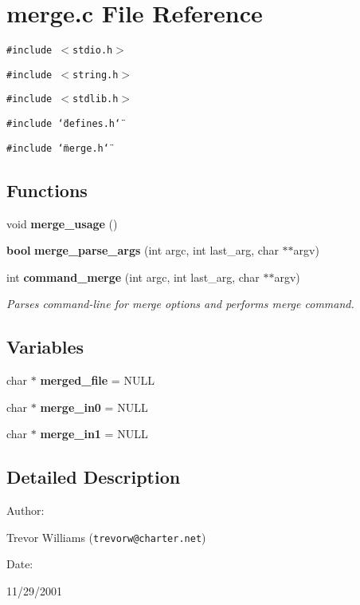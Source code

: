 \section{merge.c File Reference}
\label{merge_8c}
{\tt \#include $<$stdio.h$>$}\par
{\tt \#include $<$string.h$>$}\par
{\tt \#include $<$stdlib.h$>$}\par
{\tt \#include \char`\"{}defines.h\char`\"{}}\par
{\tt \#include \char`\"{}merge.h\char`\"{}}\par
\subsection*{Functions}
\begin{CompactItemize}
\item 
void {\bf merge\_\-usage} ()
\item 
{\bf bool} {\bf merge\_\-parse\_\-args} (int argc, int last\_\-arg, char $\ast$$\ast$argv)
\item 
int {\bf command\_\-merge} (int argc, int last\_\-arg, char $\ast$$\ast$argv)
\begin{CompactList}\small\item\em Parses command-line for merge options and performs merge command.\item\end{CompactList}\end{CompactItemize}
\subsection*{Variables}
\begin{CompactItemize}
\item 
char $\ast$ {\bf merged\_\-file} = NULL
\item 
char $\ast$ {\bf merge\_\-in0} = NULL
\item 
char $\ast$ {\bf merge\_\-in1} = NULL
\end{CompactItemize}


\subsection{Detailed Description}


\begin{Desc}
\item[Author: ]\par
Trevor Williams ({\tt trevorw@charter.net}) \end{Desc}
\begin{Desc}
\item[Date: ]\par
11/29/2001\end{Desc}


